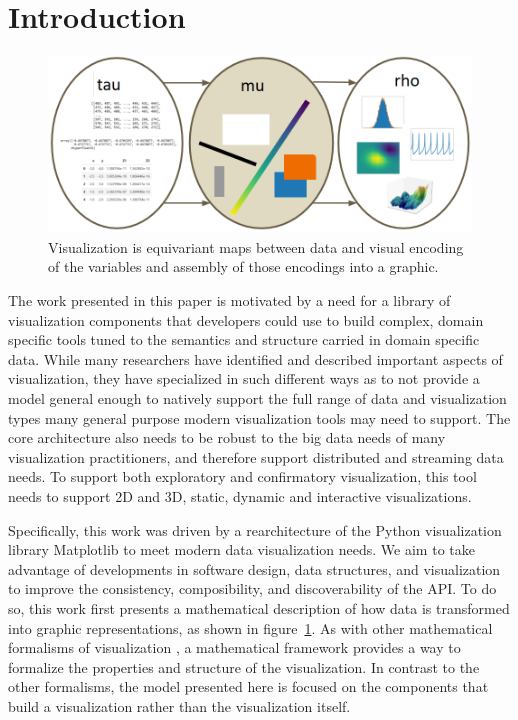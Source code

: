 \documentclass[../main.tex]{subfiles}
\begin{document}
\section{Introduction}
\label{sec:intro}
\begin{figure}[H]
    \includegraphics[width=\textwidth]{figures/math/dar.png}
    \caption{Visualization is equivariant maps between data and visual encoding of the variables and assembly of those encodings into a graphic.
    }
    \label{fig:intro_artist_stages}
\end{figure}
The work presented in this paper is motivated by a need for a library of visualization components that developers could use to build complex, domain specific tools tuned to the semantics and structure carried in domain specific data. While many researchers have identified and described important aspects of visualization, they have specialized in such different ways as to not provide a model general enough to natively support the full range of data and visualization types many general purpose modern visualization tools may need to support. The core architecture also needs to be robust to the big data needs of many visualization practitioners, and therefore support distributed and streaming data needs. To support both exploratory and confirmatory visualization\cite{tukeyWeNeedBoth1980}, this tool needs to support 2D and 3D, static, dynamic and interactive visualizations. 

Specifically, this work was driven by a rearchitecture of the Python visualization library Matplotlib\cite{hunterMatplotlib2DGraphics2007} to meet modern data visualization needs. We aim to take advantage of developments in software design, data structures, and visualization to improve the consistency, composibility, and discoverability of the API. To do so, this work first presents a mathematical description of how data is transformed into graphic representations, as shown in figure~\ref{fig:intro_artist_stages}. As with other mathematical formalisms of visualization \cite{mackinlayAutomatingDesignGraphical1986,kindlmann2014algebraic,sugibuchiFramwork2009,vickersUnderstandingViz2013}, a mathematical framework provides a way to formalize the properties and structure of the visualization. In contrast to the other formalisms, the model presented here is focused on the components that build a visualization rather than the visualization itself. 
\end{document}
